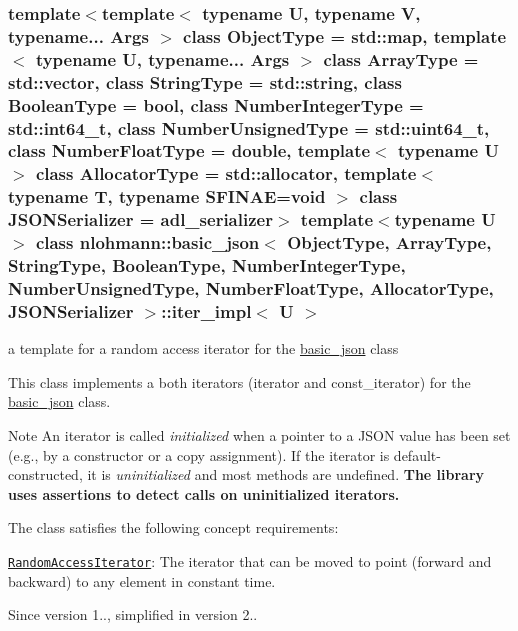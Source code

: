 \subsubsection*{template$<$template$<$ typename U, typename V, typename... Args $>$ class Object\+Type = std\+::map, template$<$ typename U, typename... Args $>$ class Array\+Type = std\+::vector, class String\+Type = std\+::string, class Boolean\+Type = bool, class Number\+Integer\+Type = std\+::int64\+\_\+t, class Number\+Unsigned\+Type = std\+::uint64\+\_\+t, class Number\+Float\+Type = double, template$<$ typename U $>$ class Allocator\+Type = std\+::allocator, template$<$ typename T, typename S\+F\+I\+N\+A\+E=void $>$ class J\+S\+O\+N\+Serializer = adl\+\_\+serializer$>$\newline
template$<$typename U$>$\newline
class nlohmann\+::basic\+\_\+json$<$ Object\+Type, Array\+Type, String\+Type, Boolean\+Type, Number\+Integer\+Type, Number\+Unsigned\+Type, Number\+Float\+Type, Allocator\+Type, J\+S\+O\+N\+Serializer $>$\+::iter\+\_\+impl$<$ U $>$}

a template for a random access iterator for the \hyperlink{classnlohmann_1_1basic__json}{basic\+\_\+json} class 

This class implements a both iterators (iterator and const\+\_\+iterator) for the \hyperlink{classnlohmann_1_1basic__json}{basic\+\_\+json} class.

\begin{DoxyNote}{Note}
An iterator is called {\itshape initialized} when a pointer to a J\+S\+ON value has been set (e.\+g., by a constructor or a copy assignment). If the iterator is default-\/constructed, it is {\itshape uninitialized} and most methods are undefined. {\bfseries The library uses assertions to detect calls on uninitialized iterators.}
\end{DoxyNote}
The class satisfies the following concept requirements\+:
\begin{DoxyItemize}
\item \href{http://en.cppreference.com/w/cpp/concept/RandomAccessIterator}{\tt Random\+Access\+Iterator}\+: The iterator that can be moved to point (forward and backward) to any element in constant time.
\end{DoxyItemize}

\begin{DoxySince}{Since}
version 1.., simplified in version 2.. 
\end{DoxySince}


